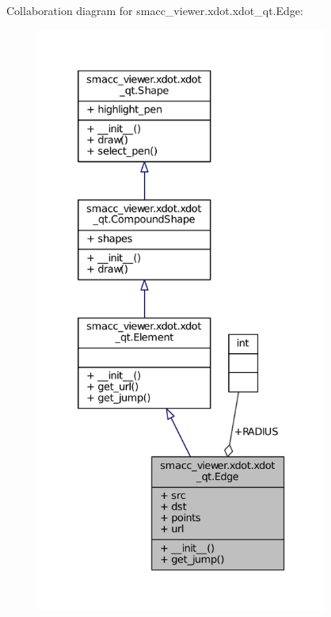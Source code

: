 Collaboration diagram for smacc\+\_\+viewer.\+xdot.\+xdot\+\_\+qt.\+Edge\+:
\nopagebreak
\begin{figure}[H]
\begin{center}
\leavevmode
\includegraphics[height=550pt]{classsmacc__viewer_1_1xdot_1_1xdot__qt_1_1Edge__coll__graph}
\end{center}
\end{figure}
